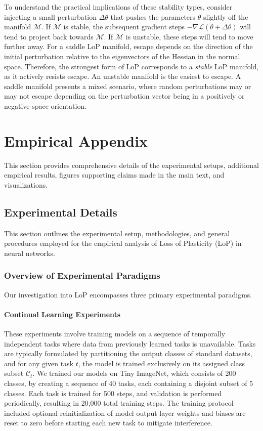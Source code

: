 \documentclass{article}
\newcommand{\Loss}{\mathcal{L}}
\numberwithin{figure}{section}
\begin{document}
To understand the practical implications of these stability types, consider injecting a small perturbation $\Delta\theta$ that pushes the parameters $\theta$ slightly off the manifold $\mathcal{M}$. If $\mathcal{M}$ is stable, the subsequent gradient steps $-\nabla \Loss(\theta+\Delta\theta)$ will tend to project back towards $\mathcal{M}$. If $\mathcal{M}$ is unstable, these steps will tend to move further away. For a saddle LoP manifold, escape depends on the direction of the initial perturbation relative to the eigenvectors of the Hessian in the normal space.
Therefore, the strongest form of LoP corresponds to a \emph{stable} LoP manifold, as it actively resists escape. An unstable manifold is the easiest to escape. A saddle manifold presents a mixed scenario, where random perturbations may or may not escape depending on the perturbation vector being in a positively or negative space orientation. 

\section{Empirical Appendix}
\label{app:empirical_evidence_appendix}
This section provides comprehensive details of the experimental setups, additional empirical results, figures supporting claims made in the main text, and visualizations.
\subsection{Experimental Details}
\label{sec:experimental_details}
This section outlines the experimental setup, methodologies, and general procedures employed for the empirical analysis of Loss of Plasticity (LoP) in neural networks.
\subsubsection{Overview of Experimental Paradigms}
\label{subsec:experiment_paradigms}
Our investigation into LoP encompasses three primary experimental paradigms.
\paragraph{Continual Learning Experiments}
These experiments involve training models on a sequence of temporally independent tasks where data from previously learned tasks is unavailable. Tasks are typically formulated by partitioning the output classes of standard datasets, and for any given task $t$, the model is trained exclusively on its assigned class subset $\mathcal{C}_t$. We trained our models on Tiny ImageNet, which consists of 200 classes, by creating a sequence of 40 tasks, each containing a disjoint subset of 5 classes. Each task is trained for 500 steps, and validation is performed periodically, resulting in 20,000 total training steps. The training protocol included optional reinitialization of model output layer weights and biases are reset to zero before starting each new task to mitigate interference.
\end{document}
